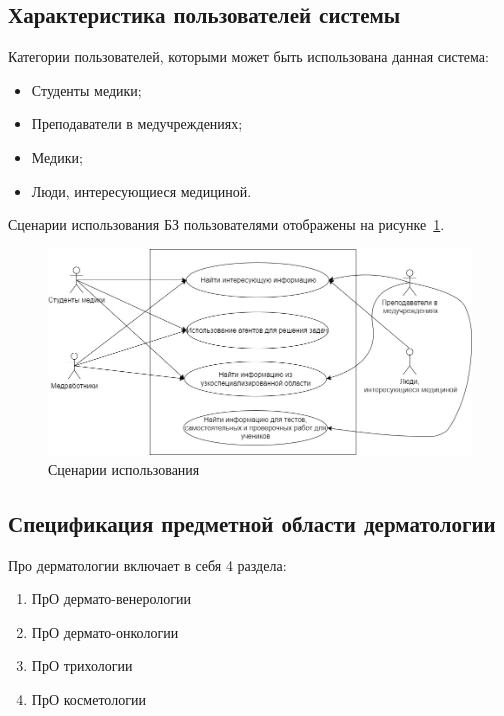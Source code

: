\subsection{Характеристика пользователей системы}
Категории пользователей, которыми может быть использована данная система:
\begin{itemize}
	\item Студенты медики;
	\item Преподаватели в медучреждениях;
	\item Медики;
	\item Люди, интересующиеся медициной.
\end{itemize}
Сценарии использования БЗ пользователями отображены на рисунке~\ref{fig:sections/users}.
\begin{figure}[H]
	\centering
	\includegraphics[width=1.0\textwidth]{sections/users.jpeg}
	\caption{Сценарии использования}
	\label{fig:sections/users}
\end{figure}
\subsection{Спецификация предметной области дерматологии}
Про дерматологии включает в себя 4 раздела:
\begin{enumerate}
	\item ПрО дермато-венерологии
	\item ПрО дермато-онкологии
	\item ПрО трихологии 
	\item ПрО косметологии\\
\end{enumerate}

